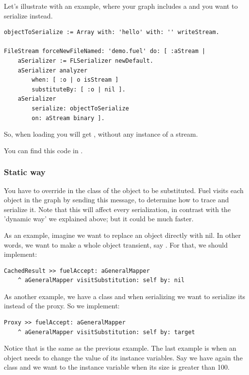 \documentclass[a4paper,10pt,twoside]{book}
\begin{document}
Let's illustrate with an example, where your graph includes a  and you want to serialize  instead. 

\begin{lstlisting}
objectToSerialize := Array with: 'hello' with: '' writeStream.

FileStream forceNewFileNamed: 'demo.fuel' do: [ :aStream |
    aSerializer := FLSerializer newDefault.
    aSerializer analyzer 
        when: [ :o | o isStream ] 
        substituteBy: [ :o | nil ].
    aSerializer         
        serialize: objectToSerialize
        on: aStream binary ].
\end{lstlisting}

So, when loading you will get , without any instance of a stream.

You can find this code in .

\subsubsection{Static way}

You have to override  in the class of the object to be substituted. Fuel visits each object in the graph by sending this message, to determine how to trace and serialize it. Note that this will affect every serialization, in contrast with the 'dynamic way' we explained above; but it could be much faster.

As an example, imagine we want to replace an object directly with nil. In other words, we want to make a whole object transient, say . For that, we should implement:

\begin{lstlisting}
CachedResult >> fuelAccept: aGeneralMapper
    ^ aGeneralMapper visitSubstitution: self by: nil
\end{lstlisting}

As another example, we have a  class and when serializing we want to serialize its  instead of the proxy. So we implement:

\begin{lstlisting}
Proxy >> fuelAccept: aGeneralMapper
    ^ aGeneralMapper visitSubstitution: self by: target
\end{lstlisting}

Notice that  is the same as the previous example. The last example is when an object needs to change the value of its instance variables. Say we have again the class  and we want to  the instance variable  when its size is greater than 100. 
\end{document}
